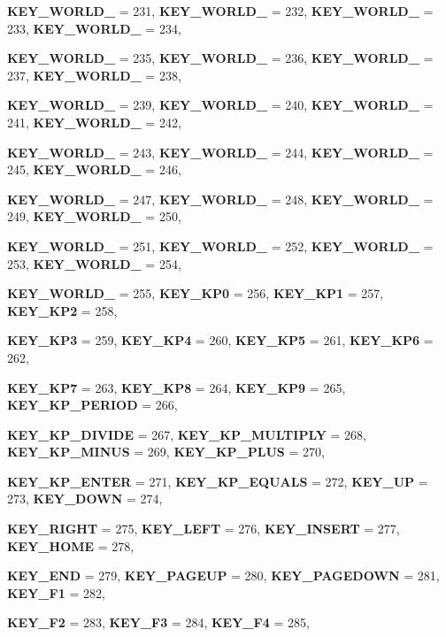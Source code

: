 \begin{DoxyCompactItemize}
{\bfseries KEY\_\-WORLD\_} =  231, 
{\bfseries KEY\_\-WORLD\_} =  232, 
{\bfseries KEY\_\-WORLD\_} =  233, 
{\bfseries KEY\_\-WORLD\_} =  234, 
\par
{\bfseries KEY\_\-WORLD\_} =  235, 
{\bfseries KEY\_\-WORLD\_} =  236, 
{\bfseries KEY\_\-WORLD\_} =  237, 
{\bfseries KEY\_\-WORLD\_} =  238, 
\par
{\bfseries KEY\_\-WORLD\_} =  239, 
{\bfseries KEY\_\-WORLD\_} =  240, 
{\bfseries KEY\_\-WORLD\_} =  241, 
{\bfseries KEY\_\-WORLD\_} =  242, 
\par
{\bfseries KEY\_\-WORLD\_} =  243, 
{\bfseries KEY\_\-WORLD\_} =  244, 
{\bfseries KEY\_\-WORLD\_} =  245, 
{\bfseries KEY\_\-WORLD\_} =  246, 
\par
{\bfseries KEY\_\-WORLD\_} =  247, 
{\bfseries KEY\_\-WORLD\_} =  248, 
{\bfseries KEY\_\-WORLD\_} =  249, 
{\bfseries KEY\_\-WORLD\_} =  250, 
\par
{\bfseries KEY\_\-WORLD\_} =  251, 
{\bfseries KEY\_\-WORLD\_} =  252, 
{\bfseries KEY\_\-WORLD\_} =  253, 
{\bfseries KEY\_\-WORLD\_} =  254, 
\par
{\bfseries KEY\_\-WORLD\_} =  255, 
{\bfseries KEY\_\-KP0} =  256, 
{\bfseries KEY\_\-KP1} =  257, 
{\bfseries KEY\_\-KP2} =  258, 
\par
{\bfseries KEY\_\-KP3} =  259, 
{\bfseries KEY\_\-KP4} =  260, 
{\bfseries KEY\_\-KP5} =  261, 
{\bfseries KEY\_\-KP6} =  262, 
\par
{\bfseries KEY\_\-KP7} =  263, 
{\bfseries KEY\_\-KP8} =  264, 
{\bfseries KEY\_\-KP9} =  265, 
{\bfseries KEY\_\-KP\_\-PERIOD} =  266, 
\par
{\bfseries KEY\_\-KP\_\-DIVIDE} =  267, 
{\bfseries KEY\_\-KP\_\-MULTIPLY} =  268, 
{\bfseries KEY\_\-KP\_\-MINUS} =  269, 
{\bfseries KEY\_\-KP\_\-PLUS} =  270, 
\par
{\bfseries KEY\_\-KP\_\-ENTER} =  271, 
{\bfseries KEY\_\-KP\_\-EQUALS} =  272, 
{\bfseries KEY\_\-UP} =  273, 
{\bfseries KEY\_\-DOWN} =  274, 
\par
{\bfseries KEY\_\-RIGHT} =  275, 
{\bfseries KEY\_\-LEFT} =  276, 
{\bfseries KEY\_\-INSERT} =  277, 
{\bfseries KEY\_\-HOME} =  278, 
\par
{\bfseries KEY\_\-END} =  279, 
{\bfseries KEY\_\-PAGEUP} =  280, 
{\bfseries KEY\_\-PAGEDOWN} =  281, 
{\bfseries KEY\_\-F1} =  282, 
\par
{\bfseries KEY\_\-F2} =  283, 
{\bfseries KEY\_\-F3} =  284, 
{\bfseries KEY\_\-F4} =  285, 

\end{DoxyCompactItemize}
